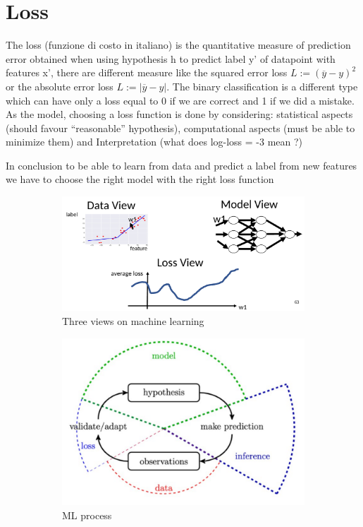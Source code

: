 \section{Loss}
The loss (funzione di costo in italiano) is the quantitative measure of prediction error obtained when using hypothesis h to predict label y’ of datapoint with features x’, there are different measure like the squared error loss $ L:= (\overline{y} - y)^2$ or the absolute error loss $L:= |\overline{y}-y|$. The binary classification is a different type which can have only a loss equal to 0 if we are correct and 1 if we did a mistake. As the model, choosing a loss function is done by considering: statistical aspects (should favour “reasonable” hypothesis), computational aspects (must be able to minimize them) and Interpretation (what does log-loss = -3 mean ?)

In conclusion to be able to learn from data and predict a label from new features we have to choose the right model with the right loss function
\begin{figure}[H]
\centering
    \begin{subfigure}{.4\textwidth}
        \centering
        \includegraphics[width=1\linewidth]{images/3Comp/3comp7.png}
        \caption{Three views on machine learning}
        \label{fig:sub1}
    \end{subfigure}
    \begin{subfigure}{.4 \textwidth}
        \centering
        \includegraphics[width=1\linewidth]{images/3Comp/3comp8.png}
        \caption{ML process}
        \label{fig:sub1}
    \end{subfigure}
    \caption{}
\end{figure}

